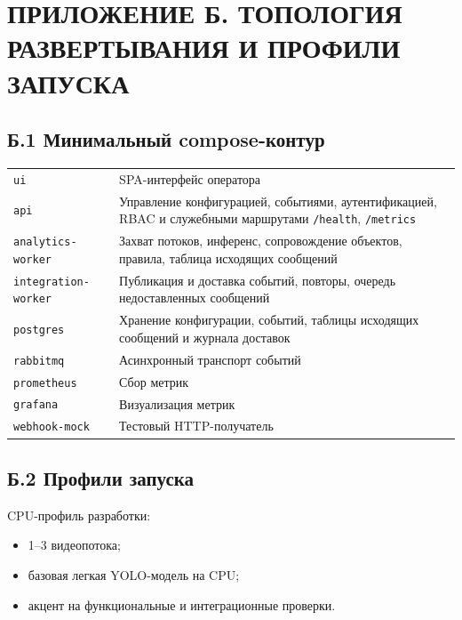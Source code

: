 \chapter*{ПРИЛОЖЕНИЕ Б. ТОПОЛОГИЯ РАЗВЕРТЫВАНИЯ И ПРОФИЛИ ЗАПУСКА}
{}

\section*{Б.1 Минимальный compose-контур}
{}

\begin{longtable}{@{}p{}p{}@{}}
\texttt{ui} & SPA-интерфейс оператора \\
\texttt{api} & Управление конфигурацией, событиями, аутентификацией, RBAC и служебными маршрутами \texttt{/health}, \texttt{/metrics} \\
\texttt{analytics-worker} & Захват потоков, инференс, сопровождение объектов, правила, таблица исходящих сообщений \\
\texttt{integration-worker} & Публикация и доставка событий, повторы, очередь недоставленных сообщений \\
\texttt{postgres} & Хранение конфигурации, событий, таблицы исходящих сообщений и журнала доставок \\
\texttt{rabbitmq} & Асинхронный транспорт событий \\
\texttt{prometheus} & Сбор метрик \\
\texttt{grafana} & Визуализация метрик \\
\texttt{webhook-mock} & Тестовый HTTP-получатель \\
\end{longtable}

\section*{Б.2 Профили запуска}
{}

CPU-профиль разработки:
\begin{itemize}
    \item 1--3 видеопотока;
    \item базовая легкая YOLO-модель на CPU;
    \item акцент на функциональные и интеграционные проверки.
\end{itemize}

